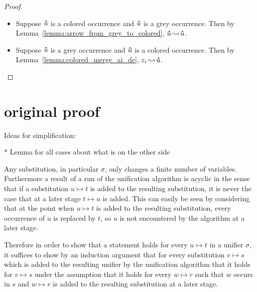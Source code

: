 \documentclass[,%
	paper=a4,%
	DIV10, %
	twoside=false,%
	liststotoc,
	bibtotoc,
	draft=false,%
	numbers=noendperiod
]{scrartcl}
\begin{document}
\begin{proof}
\begin{description}
\begin{itemize}
				\item Suppose $\bm\dot u$ is a colored occurrence and $\bm\hat u$ is a grey occurrence.
					Then by Lemma~\ref{lemma:arrow_from_grey_to_colored}, $\bm\hat u \operatorname{\leadsto} \bm\dot u$.

				\item Suppose $\bm\dot u$ is a grey occurrence and $\bm\hat u$ is a colored occurrence.
					Then by Lemma~\ref{lemma:colored_merge_ai_de}, $z_i \operatorname{\leadsto} \bm\dot u$.


			\end{itemize}


	\end{description}

\end{proof}




\section{original proof}

Ideas for simplification:

* Lemma for all cases about what is on the other side

\begin{remark}[\substremarksym]
	Any substitution, in particular $\sigma$, only changes a finite number of variables.
	Furthermore a result of a run of the unification algorithm is acyclic in the sense that if a substitution $u\mapsto t$ is added to the resulting substitution, it is never the case that at a later stage $t\mapsto u$ is added.
	This can easily be seen by considering that at the point when $u\mapsto t$ is added to the resulting substitution, every occurrence of $u$ is replaced by $t$, so $u$ is not encountered by the algorithm at a later stage.

	Therefore in order to show that a statement holds for every $u\mapsto t$ in a unifier $\sigma$, 
	it suffices to show by an induction argument that for every substitution $v\mapsto s$ which is added to the resulting unifier by the unification algorithm that it holds for $v\mapsto s$ under the assumption that it holds for every $w\mapsto r$ such that $w$ occurs in $s$ and $w\mapsto r$ is added to the resulting substitution at a later stage.
\end{remark}
\end{document}
